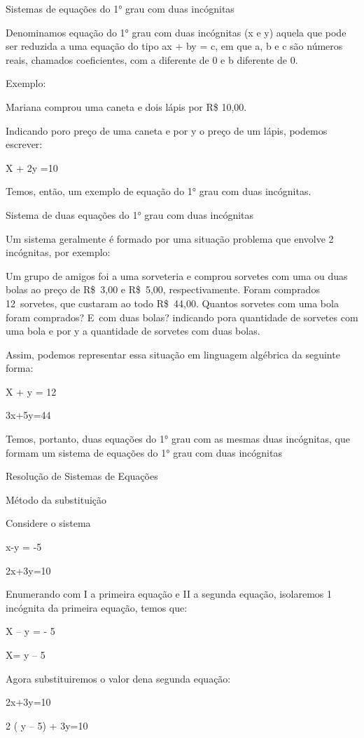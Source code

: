 Sistemas de equações do 1° grau com duas incógnitas

Denominamos equação do 1° grau com duas incógnitas (x e y) aquela que
pode ser reduzida a uma equação do tipo ax + by = c, em que a, b e c são
números reais, chamados coeficientes, com a diferente de 0 e b diferente
de 0.

Exemplo:

Mariana comprou uma caneta e dois lápis por R\$ 10,00.

Indicando por\times o preço de uma caneta e por y o preço de um lápis,
podemos escrever:

X + 2y =10

Temos, então, um exemplo de equação do 1° grau com duas incógnitas.

Sistema de duas equações do 1° grau com duas incógnitas

Um sistema geralmente é formado por uma situação problema que envolve 2
incógnitas, por exemplo:

Um grupo de amigos foi a uma sorveteria e comprou sorvetes com uma ou
duas bolas ao preço de R\$~3,00 e R\$~5,00, respectivamente. Foram
comprados 12~sorvetes, que custaram ao todo R\$~44,00. Quantos sorvetes
com uma bola foram comprados? E~com duas bolas? indicando por\times a
quantidade de sorvetes com uma bola e por y a quantidade de sorvetes com
duas bolas.

Assim, podemos representar essa situação em linguagem algébrica da
seguinte forma:

X + y = 12

3x+5y=44

Temos, portanto, duas equações do 1° grau com as mesmas duas incógnitas,
que formam um sistema de equações do 1° grau com duas incógnitas

Resolução de Sistemas de Equações

Método da substituição

Considere o sistema

x-y = -5

2x+3y=10

Enumerando com I a primeira equação e II a segunda equação, isolaremos 1
incógnita da primeira equação, temos que:

X -- y = - 5

X= y -- 5

Agora substituiremos o valor de\times na segunda equação:

2x+3y=10

2 ( y -- 5) + 3y=10

